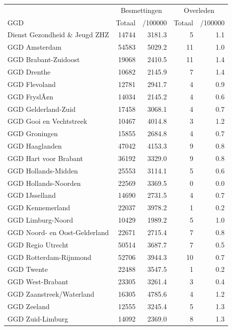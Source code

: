 \documentclass[
  english,
  man,floatsintext]{apa6}
\begin{document}
\begin{table}
\centering\begingroup\fontsize{10}{12}\selectfont

\begin{threeparttable}
\begin{tabular}{lrrrr}
\toprule
\multicolumn{1}{c}{ } & \multicolumn{2}{c}{Besmettingen} & \multicolumn{2}{c}{Overleden} \\
\cmidrule(l{3pt}r{3pt}){2-3} \cmidrule(l{3pt}r{3pt}){4-5}
GGD & Totaal & /100000 & Totaal & /100000\\
\midrule
Dienst Gezondheid \& Jeugd ZHZ & 14744 & 3181.3 & 5 & 1.1\\
GGD Amsterdam & 54583 & 5029.2 & 11 & 1.0\\
GGD Brabant-Zuidoost & 19068 & 2410.5 & 11 & 1.4\\
GGD Drenthe & 10682 & 2145.9 & 7 & 1.4\\
GGD Flevoland & 12781 & 2941.7 & 4 & 0.9\\
GGD FryslÃ¢n & 14034 & 2145.2 & 4 & 0.6\\
GGD Gelderland-Zuid & 17458 & 3068.1 & 4 & 0.7\\
GGD Gooi en Vechtstreek & 10467 & 4014.8 & 3 & 1.2\\
GGD Groningen & 15855 & 2684.8 & 4 & 0.7\\
GGD Haaglanden & 47042 & 4153.3 & 9 & 0.8\\
GGD Hart voor Brabant & 36192 & 3329.0 & 9 & 0.8\\
GGD Hollands-Midden & 25553 & 3114.1 & 5 & 0.6\\
GGD Hollands-Noorden & 22569 & 3369.5 & 0 & 0.0\\
GGD IJsselland & 14690 & 2731.5 & 4 & 0.7\\
GGD Kennemerland & 22037 & 3978.2 & 1 & 0.2\\
GGD Limburg-Noord & 10429 & 1989.2 & 5 & 1.0\\
GGD Noord- en Oost-Gelderland & 22671 & 2715.4 & 7 & 0.8\\
GGD Regio Utrecht & 50514 & 3687.7 & 7 & 0.5\\
GGD Rotterdam-Rijnmond & 52706 & 3944.3 & 10 & 0.7\\
GGD Twente & 22488 & 3547.5 & 1 & 0.2\\
GGD West-Brabant & 23305 & 3261.4 & 3 & 0.4\\
GGD Zaanstreek/Waterland & 16305 & 4785.6 & 4 & 1.2\\
GGD Zeeland & 12555 & 3245.4 & 5 & 1.3\\
GGD Zuid-Limburg & 14092 & 2369.0 & 8 & 1.3\\

\end{tabular}
\end{threeparttable}
\end{table}
\end{document}
